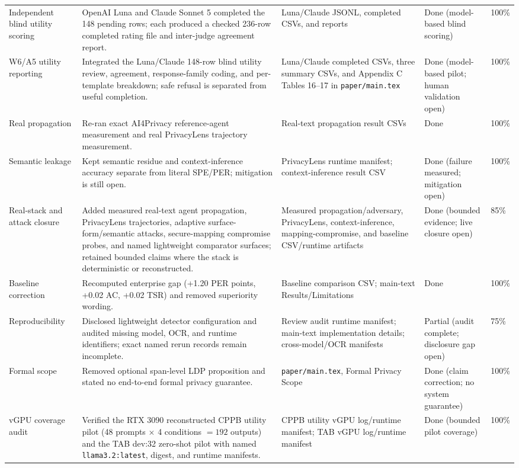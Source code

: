 \documentclass[11pt]{article}
\begin{document}
\begin{longtable}{p{}p{}p{}p{}p{}}
Independent blind utility scoring & OpenAI Luna and Claude Sonnet 5 completed the 148 pending rows; each produced a checked 236-row completed rating file and inter-judge agreement report. & Luna/Claude JSONL, completed CSVs, and reports & Done (model-based blind scoring) & 100\% \\
W6/A5 utility reporting & Integrated the Luna/Claude 148-row blind utility review, agreement, response-family coding, and per-template breakdown; safe refusal is separated from useful completion. & Luna/Claude completed CSVs, three summary CSVs, and Appendix C Tables 16--17 in \texttt{paper/main.tex} & Done (model-based pilot; human validation open) & 100\% \\
Real propagation & Re-ran exact AI4Privacy reference-agent measurement and real PrivacyLens trajectory measurement. & Real-text propagation result CSVs & Done & 100\% \\
Semantic leakage & Kept semantic residue and context-inference accuracy separate from literal SPE/PER; mitigation is still open. & PrivacyLens runtime manifest; context-inference result CSV & Done (failure measured; mitigation open) & 100\% \\
Real-stack and attack closure & Added measured real-text agent propagation, PrivacyLens trajectories, adaptive surface-form/semantic attacks, secure-mapping compromise probes, and named lightweight comparator surfaces; retained bounded claims where the stack is deterministic or reconstructed. & Measured propagation/adversary, PrivacyLens, context-inference, mapping-compromise, and baseline CSV/runtime artifacts & Done (bounded evidence; live closure open) & 85\% \\
Baseline correction & Recomputed enterprise gap (+1.20 PER points, +0.02 AC, +0.02 TSR) and removed superiority wording. & Baseline comparison CSV; main-text Results/Limitations & Done & 100\% \\
Reproducibility & Disclosed lightweight detector configuration and audited missing model, OCR, and runtime identifiers; exact named rerun records remain incomplete. & Review audit runtime manifest; main-text implementation details; cross-model/OCR manifests & Partial (audit complete; disclosure gap open) & 75\% \\
Formal scope & Removed optional span-level LDP proposition and stated no end-to-end formal privacy guarantee. & \texttt{paper/main.tex}, Formal Privacy Scope & Done (claim correction; no system guarantee) & 100\% \\
vGPU coverage audit & Verified the RTX 3090 reconstructed CPPB utility pilot (48 prompts $\times$ 4 conditions $=192$ outputs) and the TAB dev:32 zero-shot pilot with named \texttt{llama3.2:latest}, digest, and runtime manifests. & CPPB utility vGPU log/runtime manifest; TAB vGPU log/runtime manifest & Done (bounded pilot coverage) & 100\% \\

\end{longtable}
\end{document}
